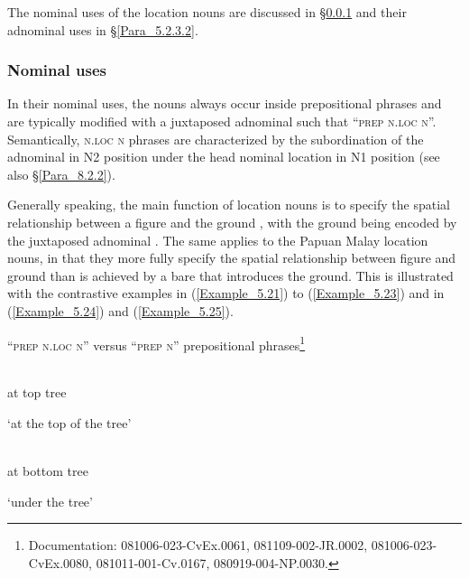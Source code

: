 The nominal uses of the location nouns are discussed in §\ref{Para_5.2.3.1} and their adnominal uses in §\ref{Para_5.2.3.2}.


\subsubsection[Nominal uses]{Nominal uses}
\label{Para_5.2.3.1}
In their nominal uses, the nouns always occur inside prepositional phras\-es and are typically modified with a juxtaposed adnominal  such that ``\textsc{prep} \textsc{n.loc} \textsc{n}''. Semantically, \textsc{n.loc} \textsc{n}  phrases are characterized by the subordination of the adnominal  in \textsc{N2} position under the head nominal location  in N1 position (see also §\ref{Para_8.2.2}).



Generally speaking, the main function of location nouns is to specify the spatial relationship between a figure and the ground \citep[3]{Levinson.2006}, with the ground being encoded by the juxtaposed adnominal . The same applies to the Papuan Malay location nouns, in that they more fully specify the spatial relationship between figure and ground than is achieved by a bare  that introduces the ground. This is illustrated with the contrastive examples in (\ref{Example_5.21}) to (\ref{Example_5.23}) and in (\ref{Example_5.24}) and (\ref{Example_5.25}).


\begin{styleExampleTitle}
``\textsc{prep} \textsc{n.loc} \textsc{n}'' versus ``\textsc{prep} \textsc{n}'' prepositional phrases\footnote{Documentation: 081006-023-CvEx.0061, 081109-002-JR.0002, 081006-023-CvEx.0080, 081011-001-Cv.0167, 080919-004-NP.0030.}
\end{styleExampleTitle}


\ea
\label{Example_5.21}
 {} {}\\ %
at  top  tree    \\
\glt

‘at the top of the tree’\\
\z


\ea
\label{Example_5.22}
\gll  {}    \\
 at  bottom  tree    \\
\glt

‘under the tree’\\
\z


